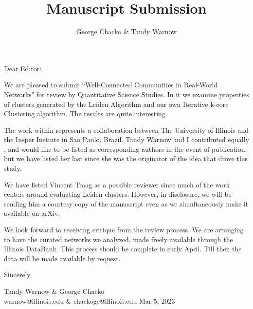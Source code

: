 \documentclass[11pt, oneside]{article}   	%
\title{Manuscript Submission}
\author{George Chacko & Tandy Warnow}
\begin{document}

\noindent
Dear Editor:
\vspace{10mm}

We are pleased to submit ``Well-Connected Communities in Real-World Networks" for review by Quantitative Science Studies. In it we examine properties of clusters generated by the Leiden Algorithm and our own Iterative k-core Clustering algorithm. The results are quite interesting.

\vspace{3mm}

The work within represents a collaboration between The University of Illinois and the Insper Instiute in Sao Paulo, Brazil.  Tandy Warnow and I contributed equally , and would like to be listed as corresponding authors in the event of publication, but we have listed her last since she was the originator of the idea that drove this study.

\vspace{3mm}

We have listed Vincent Traag as a possible reviewer since much of the work centers around evaluating Leiden clusters. However, in disclosure, we will be sending him a courtesy copy of the manuscript even as we simultaneously make it available on arXiv. 
\vspace{3mm}


We look forward to receiving critique from the review process. We are arranging to have the curated networks we analyzed, made freely available through the Illinois DataBank. This process should be complete in early April. Till then the data 
will be made available by request.

\vspace{3mm}
\noindent
Sincerely


\vspace{8
mm}
\noindent
Tandy Warnow \& George Chacko\\
\noindent
warnow@illinois.edu \& chackoge@illinois.edu
Mar 5, 2023
\end{document}
